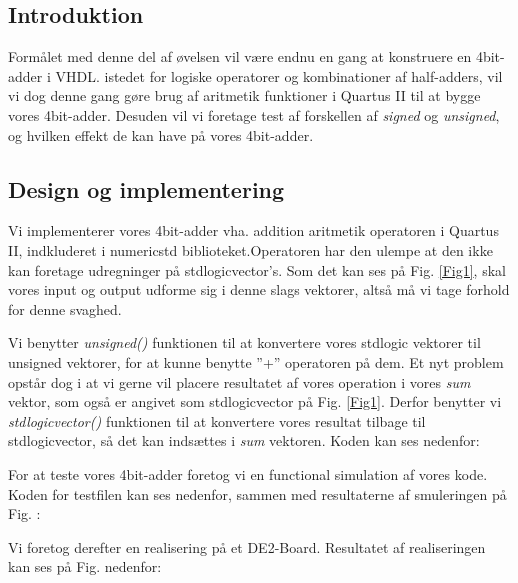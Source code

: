 \documentclass[../journal2.tex]{subfiles}
\begin{document}
\subsection{Introduktion}
Formålet med denne del af øvelsen vil være endnu en gang at konstruere en 4bit-adder i VHDL. istedet for logiske operatorer og kombinationer af half-adders, vil vi dog denne gang gøre brug af aritmetik funktioner i Quartus II til at bygge vores 4bit-adder. Desuden vil vi foretage test af forskellen af \textit{signed} og \textit{unsigned}, og hvilken effekt de kan have på vores 4bit-adder.

\subsection{Design og implementering}
Vi implementerer vores 4bit-adder vha. addition aritmetik operatoren i Quartus II, indkluderet i numeric\textunderscore std biblioteket.Operatoren har den ulempe at den ikke kan foretage udregninger på std\textunderscore logic\textunderscore vector's. Som det kan ses på Fig. \ref{Fig1}, skal vores input og output udforme sig i denne slags vektorer, altså må vi tage forhold for denne svaghed.


Vi benytter \textit{unsigned()} funktionen til at konvertere vores std\textunderscore logic vektorer til unsigned vektorer, for at kunne benytte ''+'' operatoren på dem. Et nyt problem opstår dog i at vi gerne vil placere resultatet af vores operation i vores \textit{sum} vektor, som også er angivet som std\textunderscore logic\textunderscore vector på Fig. \ref{Fig1}. Derfor benytter vi \textit{std\textunderscore logic\textunderscore vector()} funktionen til at konvertere vores resultat tilbage til std\textunderscore logic\textunderscore vector, så det kan indsættes i \textit{sum} vektoren. Koden kan ses nedenfor:


For at teste vores 4bit-adder foretog vi en functional simulation af vores kode. Koden for testfilen kan ses nedenfor, sammen med resultaterne af smuleringen på Fig. :


Vi foretog derefter en realisering på et DE2-Board. Resultatet af realiseringen kan ses på Fig. nedenfor:
\end{document}
